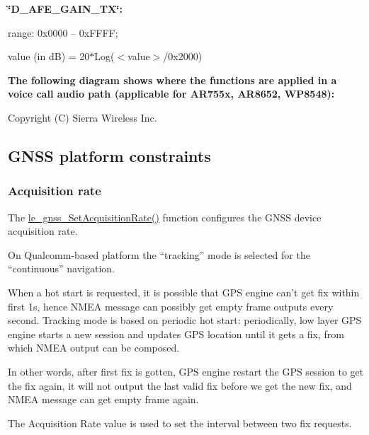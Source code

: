{\bfseries \char`\"{}\+D\+\_\+\+A\+F\+E\+\_\+\+G\+A\+I\+N\+\_\+\+T\+X\char`\"{}\+:}
\begin{DoxyItemize}
\item range\+: 0x0000 – 0x\+F\+F\+FF;
\item value (in dB) = 20$\ast$\+Log($<$value$>$/0x2000)
\end{DoxyItemize}





{\bfseries The following diagram shows where the functions are applied in a voice call audio path (applicable for A\+R755x, A\+R8652, W\+P8548)\+:}







Copyright (C) Sierra Wireless Inc. \hypertarget{platformConstraintsGnss}{}\subsection{G\+N\+SS platform constraints}\label{platformConstraintsGnss}
\hypertarget{platformConstraintsGnss_platformConstraintsGnss_acqRate}{}\subsubsection{Acquisition rate}\label{platformConstraintsGnss_platformConstraintsGnss_acqRate}
The \hyperlink{le__gnss__interface_8h_a75d96ec7ac6e0d6b58525e4c523d3b2c}{le\+\_\+gnss\+\_\+\+Set\+Acquisition\+Rate()} function configures the G\+N\+SS device acquisition rate.

On Qualcomm-\/based platform the “tracking” mode is selected for the “continuous” navigation.

When a hot start is requested, it is possible that G\+PS engine can’t get fix within first 1s, hence N\+M\+EA message can possibly get empty frame outputs every second. Tracking mode is based on periodic hot start\+: periodically, low layer G\+PS engine starts a new session and updates G\+PS location until it gets a fix, from which N\+M\+EA output can be composed.

In other words, after first fix is gotten, G\+PS engine restart the G\+PS session to get the fix again, it will not output the last valid fix before we get the new fix, and N\+M\+EA message can get empty frame again.

The \textquotesingle{}Acquisition Rate\textquotesingle{} value is used to set the interval between two fix requests.

